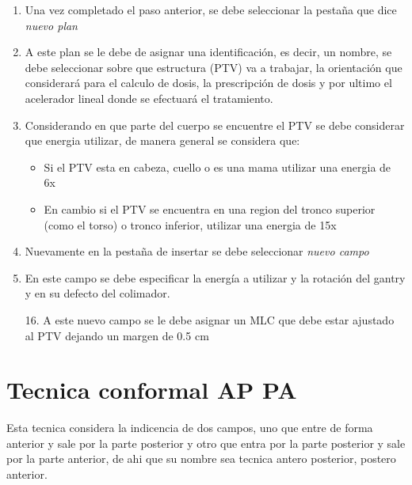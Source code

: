 \documentclass{article}
\begin{document}
\begin{tcolorbox}[colback= pastelgreen, colframe= lincolngreen, title={Consideraciones iniciales}, center title]
\begin{enumerate}
        \item Una vez completado el paso anterior, se debe seleccionar la pestaña que dice \textit{nuevo plan}
        \item A este plan se le debe de asignar una identificación, es decir, un nombre, se debe seleccionar sobre que estructura (PTV) va a trabajar, la orientación que considerará para el calculo de dosis, la prescripción de dosis y por ultimo el acelerador lineal donde se efectuará el tratamiento.
        \item Considerando en que parte del cuerpo se encuentre el PTV se debe considerar que energia utilizar, de manera general se considera que:
            \begin{itemize}
                \item Si el PTV esta en cabeza, cuello o es una mama utilizar una energia de 6x
                \item En cambio si el PTV se encuentra en una region del tronco superior (como el torso) o tronco inferior, utilizar una energia de 15x
            \end{itemize} 
        \item Nuevamente en la pestaña de insertar se debe seleccionar \textit{nuevo campo}
        \item En este campo se debe especificar la energía a utilizar y la rotación del gantry y en su defecto del colimador.
        
    \end{enumerate}

\end{tcolorbox}


\begin{tcolorbox}[colback=pastelgreen]

    \begin{enumerate}
        \item[16.] A este nuevo campo se le debe asignar un MLC que debe estar ajustado al PTV dejando un margen de 0.5 cm
    \end{enumerate}
    
\end{tcolorbox}



\section{Tecnica conformal AP PA}

Esta tecnica considera la indicencia de dos campos, uno que entre de forma anterior y sale por la parte posterior y otro que entra por la parte posterior y sale por la parte anterior, de ahi que su nombre sea tecnica antero posterior, postero anterior. 
\end{document}
